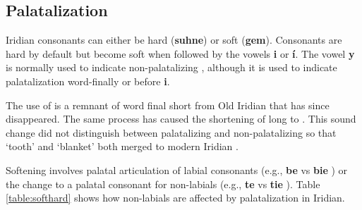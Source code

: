 \subsection{Palatalization}
\par Iridian consonants can either be hard (\textbf{suhne}) or soft (\textbf{gem}). Consonants are hard by default but become soft when followed by the vowels \textbf{i} or \textbf{í}. The vowel \textbf{y} is normally used to indicate non-palatalizing , although it is used to indicate palatalization word-finally or before \textbf{i}.

\par The use of  is a remnant of word final short  from Old Iridian that has since disappeared. The same process has caused the shortening of long  to . This sound change did not distinguish between palatalizing and non-palatalizing  so that  `tooth' and  `blanket' both merged to modern Iridian  .

\par Softening involves palatal articulation of labial consonants (e.g., \textbf{be} \textipa{[bE]} vs \textbf{bie} \textipa{[b\sx{j}E]}) or the change to a palatal consonant for non-labials (e.g., \textbf{te} \textipa{[tE]} vs \textbf{tie} \textipa{[cE]}). Table \ref{table:softhard} shows how non-labials are affected by palatalization in Iridian.

